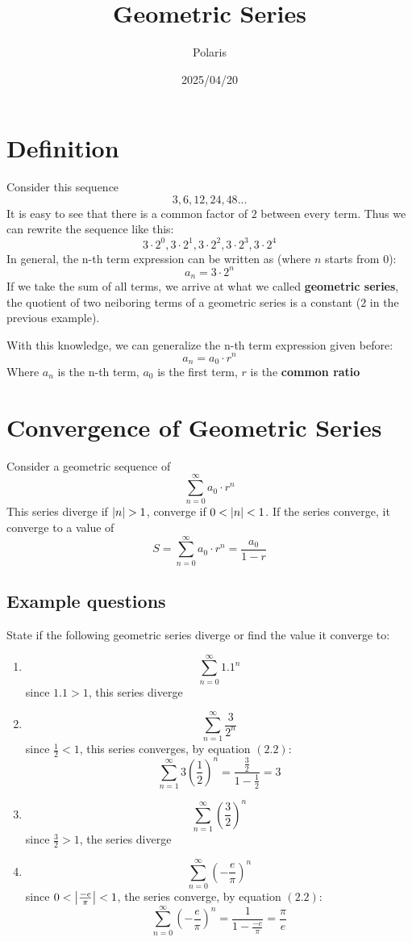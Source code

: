 \documentclass{article}
\title{Geometric Series}
\author{Polaris}
\date{2025/04/20}
\numberwithin{equation}{section}
\begin{document}
\maketitle

\section{Definition}
Consider this sequence
\[
\text{{$3,6,12,24,48$...}}
\]
It is easy to see that there is a common factor of $2$ between every term.
Thus we can rewrite the sequence like this:
\[
\text{{$3\cdot 2^0, 3\cdot 2^1, 3\cdot 2^2, 3\cdot 2^3, 3\cdot 2^4$}}
\]
In general, the n-th term expression can be written as (where $n$ starts from 0):
\[
a_n = 3\cdot 2^n
\]
If we take the sum of all terms, we arrive at what we called \textbf{geometric series},
the quotient of two neiboring terms of a geometric series is a constant ($2$ in the previous example).

With this knowledge, we can generalize the n-th term expression given before:
\[
a_n = a_0 \cdot r^n
\]
Where $a_n$ is the n-th term, $a_0$ is the first term, $r$ is the \textbf{common ratio}

\section{Convergence of Geometric Series}
Consider a geometric sequence of
\[
\sum_{n=0}^{\infty} a_0 \cdot r^n
\]
This series diverge if $\abs{n} > 1$, converge if $0 < \abs{n} < 1$. If the series converge, it converge
to a value of 
\[
S = \sum_{n=0}^{\infty} a_0 \cdot r^n = \frac{a_0}{1-r}
\]

\subsection{Example questions}
State if the following geometric series diverge or find the value it converge to:
\begin{enumerate}
    \item \[\sum_{n = 0}^\infty 1.1^n \]
    since $1.1 > 1$, this series diverge

    \item \[\sum_{n = 1}^\infty \frac{3}{2^n} \]
    since $\frac{1}{2} < 1$, this series converges, by equation $(2.2)$:
    \[
    \sum_{n = 1}^{\infty} 3(\frac{1}{2})^n = \frac{\frac{3}{2}}{1-\frac{1}{2}} = 3
    \]

    \item \[\sum_{n = 1}^{\infty} \left(\frac{3}{2} \right)^n \]
    since $\frac{3}{2} > 1$, the series diverge

    \item  \[\sum_{n = 0}^{\infty} \left( -\frac{e}{\pi}\right)^n\]
    since $0 < \abs{\frac{-e}{\pi}} < 1$, the series converge, by equation $(2.2)$:
    \[
        \sum_{n = 0}^{\infty} \left( -\frac{e}{\pi}\right)^n = \frac{1}{1 - \frac{-e}{\pi}} = \frac{\pi}{e}
    \]
\end{enumerate}
\end{document}

